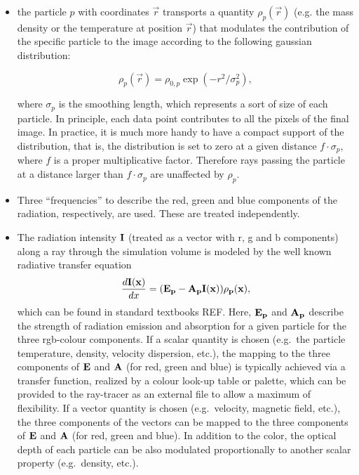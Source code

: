 \documentclass[11pt]{article}
\begin{document}
\begin{itemize}
\item
the particle $p$ with coordinates $\vec r$ transports a quantity $\rho_p(\vec r)$ 
(e.g. the mass density or the temperature at position $\vec r$)
that modulates the contribution of the specific particle to the image
according to the following gaussian distribution: 

\begin{equation}\label{smooth}
\rho_p(\vec r)=\rho_{0,p}\exp(-r^2/\sigma_p^2),
\end{equation}

where $\sigma_p$ is the smoothing length, which represents
a sort of size of each particle.  
In principle, each data point contributes to all the pixels of the final image.
In practice, it is much more handy to have a compact support of the
distribution, that is, the distribution is set to zero at a given
distance $f\cdot\sigma_p$, where $f$ is a proper multiplicative factor.
Therefore rays passing
the particle at a distance larger than $f\cdot\sigma_p$ are
unaffected by $\rho_p$.

\item
Three ``frequencies'' to describe the red, green and blue
components of the radiation, respectively, are used. These are treated independently.

\item
The radiation intensity $\bf{I}$ (treated
as a vector with r, g and b components) along a ray through the simulation
volume is modeled by the well known radiative transfer equation
\begin{equation}\label{rad}
\frac{d\bf{I}(x)}{dx}=(\bf{E}_p-\bf{A}_p\bf{I}(x))\rho_p(x),
\end{equation}
which can be found in standard textbooks REF.
Here, $\bf{E}_p$ and $\bf{A}_p$ describe the strength of radiation emission and absorption
for a given particle for the three rgb-colour components. 
If a scalar quantity is chosen (e.g.\ the particle temperature,
density, velocity dispersion, etc.), the mapping to the three components of $\bf{E}$ and $\bf{A}$ (for red, green and blue)
is typically achieved via a transfer function, realized by a colour look-up table or palette, which can
be provided to the ray-tracer as an external file to allow a maximum of flexibility. If a
vector quantity is chosen (e.g.\ velocity, magnetic field, etc.), the three components of the vectors
can be mapped to the three components of $\bf{E}$ and $\bf{A}$ (for red, green and blue). 
In addition
to the color, the optical depth of each particle can be also modulated proportionally to another
scalar property (e.g.\ density, etc.).
\end{itemize}
\end{document}
